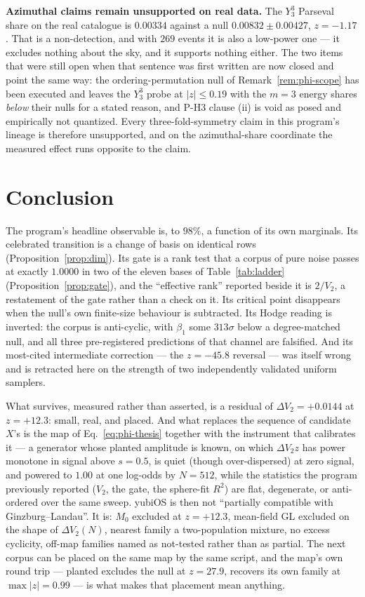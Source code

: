 \documentclass[11pt,a4paper]{article}
\theoremstyle{plain}
\theoremstyle{remark}
\theoremstyle{plain}
\begin{document}
\textbf{Azimuthal claims remain unsupported on real data.} The $Y_3^3$ Parseval share on the real catalogue is $0.00334$ against a null $0.00832\pm0.00427$, $z=-1.17$. That is a non-detection, and with $269$ events it is also a low-power one --- it excludes nothing about the sky, and it supports nothing either. The two items that were still open when that sentence was first written are now closed and point the same way: the ordering-permutation null of Remark~\ref{rem:phi-scope} has been executed and leaves the $Y_3^3$ probe at $|z|\le0.19$ with the $m{=}3$ energy shares \emph{below} their nulls for a stated reason, and P-H3 clause (ii) is void as posed and empirically not quantized. Every three-fold-symmetry claim in this program's lineage is therefore unsupported, and on the azimuthal-share coordinate the measured effect runs opposite to the claim.

\section{Conclusion}
\label{sec:conclusion}

The program's headline observable is, to $98\%$, a function of its own marginals. Its celebrated transition is a change of basis on identical rows (Proposition~\ref{prop:dim}). Its gate is a rank test that a corpus of pure noise passes at exactly $1.0000$ in two of the eleven bases of Table~\ref{tab:ladder} (Proposition~\ref{prop:gate}), and the ``effective rank'' reported beside it is $2/V_2$, a restatement of the gate rather than a check on it. Its critical point disappears when the null's own finite-size behaviour is subtracted. Its Hodge reading is inverted: the corpus is anti-cyclic, with $\beta_1$ some $313\sigma$ below a degree-matched null, and all three pre-registered predictions of that channel are falsified. And its most-cited intermediate correction --- the $z=-45.8$ reversal --- was itself wrong and is retracted here on the strength of two independently validated uniform samplers.

What survives, measured rather than asserted, is a residual of $\Delta V_2=+0.0144$ at $z=+12.3$: small, real, and placed. And what replaces the sequence of candidate $X$'s is the map of Eq.~\eqref{eq:phi-thesis} together with the instrument that calibrates it --- a generator whose planted amplitude is known, on which $\Delta V_2z$ has power monotone in signal above $s=0.5$, is quiet (though over-dispersed) at zero signal, and powered to $1.00$ at one log-odds by $N=512$, while the statistics the program previously reported ($V_2$, the gate, the sphere-fit $R^2$) are flat, degenerate, or anti-ordered over the same sweep. yubiOS is then not ``partially compatible with Ginzburg--Landau''. It is: $M_0$ excluded at $z=+12.3$, mean-field GL excluded on the shape of $\Delta V_2(N)$, nearest family a two-population mixture, no excess cyclicity, off-map families named as not-tested rather than as partial. The next corpus can be placed on the same map by the same script, and the map's own round trip --- planted excludes the null at $z=27.9$, recovers its own family at $\max|z|=0.99$ --- is what makes that placement mean anything.
\end{document}
